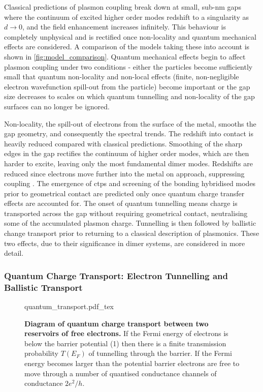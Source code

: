 \documentclass{article}
\begin{document}
Classical predictions of plasmon coupling break down at small, sub-nm gaps where the continuum of excited higher order modes redshift to a singularity as $d\rightarrow0$, and the field enhancement increases infinitely. This behaviour is completely unphysical and is rectified once non-locality and quantum mechanical effects are considered. A comparison of the models taking these into account is shown in \autoref{fig:model_comparison}. Quantum mechanical effects begin to affect plasmon coupling under two conditions - either the particles become sufficiently small that quantum non-locality and non-local effects (finite, non-negligible electron wavefunction spill-out from the particle) become important or the gap size decreases to scales on which quantum tunnelling and non-locality of the gap surfaces can no longer be ignored.

Non-locality, the spill-out of electrons from the surface of the metal, smooths the gap geometry, and consequently the spectral trends. The redshift into contact is heavily reduced compared with classical predictions. Smoothing of the sharp edges in the gap rectifies the continuum of higher order modes, which are then harder to excite, leaving only the most fundamental dimer modes. Redshifts are reduced since electrons move further into the metal on approach, suppressing coupling \cite{esteban2015}.
The emergence of \glspl{ctp} and screening of the bonding hybridised modes prior to geometrical contact are predicted only once quantum charge transfer effects are accounted for. The onset of quantum tunnelling means charge is transported across the gap without requiring geometrical contact, neutralising some of the accumulated plasmon charge. Tunnelling is then followed by ballistic change transport prior to returning to a classical description of plasmonics. These two effects, due to their significance in dimer systems, are considered in more detail.

\FloatBarrier
\subsubsection{Quantum Charge Transport: Electron Tunnelling and Ballistic Transport}

\begin{figure}[bt]
\centering
\fontsize{10pt}{1em}\selectfont
\def\svgwidth{0.65\textwidth}
{quantum_transport.pdf_tex}
\caption[Diagram of quantum charge transport between two reservoirs of free electrons]{\textbf{Diagram of quantum charge transport between two reservoirs of free electrons.} If the Fermi energy of electrons is below the barrier potential (1) then there is a finite transmission probability $T(E_F)$ of tunnelling through the barrier. If the Fermi energy becomes larger than the potential barrier electrons are free to move through a number of quantised conductance channels of conductance $2e^2/h$.}
\label{fig:quantum_tunnelling}
\vspace{-10pt}
\end{figure}
\end{document}
